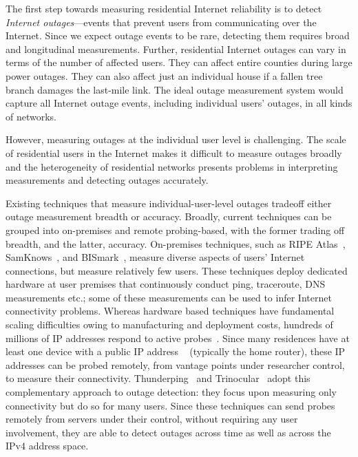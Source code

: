 

The first step towards measuring residential Internet
reliability is to detect \emph{Internet outages}---events that prevent
users from communicating over the Internet. Since we expect outage
events to be rare, detecting them requires broad and longitudinal
measurements. Further, residential Internet outages can vary in terms of the
number of affected users. They can affect entire counties during large power
outages. They can also affect just an individual house if a fallen tree
branch damages the last-mile link. The ideal outage measurement system
would capture all Internet outage events, including individual users'
outages, in all kinds of networks.

However, measuring outages at the individual user level is
challenging. The scale of residential users in the Internet makes it
difficult to measure outages broadly and the heterogeneity of
residential networks presents problems in interpreting measurements
and detecting outages accurately.

Existing techniques that measure individual-user-level outages
tradeoff either outage measurement breadth or accuracy. Broadly,
current techniques can be
grouped into on-premises and remote probing-based, with the former
trading off breadth, and the latter, accuracy. On-premises techniques, such as
RIPE Atlas~\cite{atlas}, SamKnows~\cite{samknows}, and
BISmark~\cite{bismark-main-bib}, measure diverse aspects of
users' Internet connections, but
measure relatively few users. These techniques 
deploy dedicated hardware at user premises that continuously conduct ping,
traceroute, DNS measurements etc.; some of these
measurements can be used to infer Internet connectivity problems. Whereas hardware
based techniques have fundamental scaling difficulties owing to
manufacturing and deployment costs, hundreds of millions of
IP addresses respond to active probes~\cite{timeouts}. Since many
residences have at least one device with a public IP address ~\cite{cgn-imc16}
(typically the home router), these IP addresses can be probed
remotely, from 
vantage points under researcher control, to measure their connectivity. Thunderping~\cite{pingin} and Trinocular~\cite{trinocular} adopt this
complementary approach to outage detection: they focus upon
measuring only connectivity but do so for many users. Since these
techniques can send probes remotely from servers under their control, without requiring any user
involvement, they are able to detect outages across time
as well as across the IPv4 address space.

